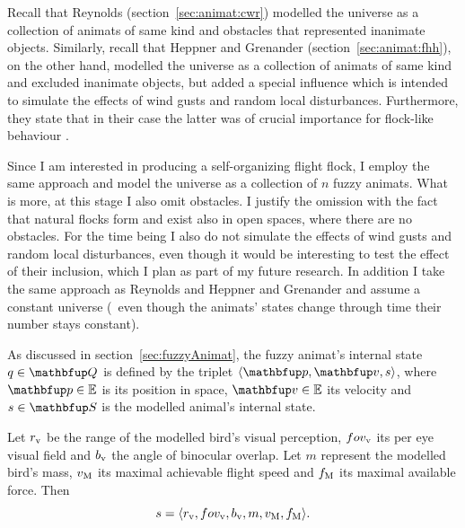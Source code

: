 Recall that Reynolds \cite{reynolds:1987} (section~\ref{sec:animat:cwr}) modelled the universe as a collection of animats of same kind and obstacles that represented inanimate objects. Similarly, recall that Heppner and Grenander \cite{heppner:1990} (section~\ref{sec:animat:fhh}), on the other hand, modelled the universe as a collection of animats of same kind and excluded inanimate objects, but added a special influence which is intended to simulate the effects of wind gusts and random local disturbances. Furthermore, they state that in their case the latter was of crucial importance for flock-like behaviour \cite{heppner:1990}.

Since I am interested in producing a self-organizing flight flock, I employ the same approach and model the universe as a collection of $n$ fuzzy animats. What is more, at this stage I also omit obstacles. I justify the omission with the fact that natural flocks form and exist also in open spaces, where there are no obstacles. For the time being I also do not simulate the effects of wind gusts and random local disturbances, even though it would be interesting to test the effect of their inclusion, which I plan as part of my future research. In addition I take the same approach as Reynolds \cite{reynolds:1987,reynolds:1999} and Heppner and Grenander \cite{heppner:1990} and assume a constant universe (\ie\ even though the animats' states change through time their number stays constant).

As discussed in section~\ref{sec:fuzzyAnimat}, the fuzzy animat's internal state $q \in \set{Q}$ is defined by the triplet $\langle \vect{p}, \vect{v}, s \rangle$, where $\vect{p} \in \E$ is its position in space, $\vect{v} \in \E$ its velocity and $s \in \set{S}$ is the modelled animal's internal state. 

\begin{definition}
\label{def:fuzzyAnimat:s:afd}
Let $r_\textnormal{v}$ be the range of the modelled bird's visual perception, $fov_\textnormal{v}$ its per eye visual field and $b_\textnormal{v}$ the angle of binocular overlap. Let $m$ represent the modelled bird's mass, $v_\textnormal{M}$ its maximal achievable flight speed and $f_\textnormal{M}$ its maximal available force. Then 
\begin{equation}
s=\langle r_\textnormal{v}, fov_\textnormal{v}, b_\textnormal{v}, m, v_\textnormal{M}, f_\textnormal{M} \rangle.
\end{equation}
\end{definition}

